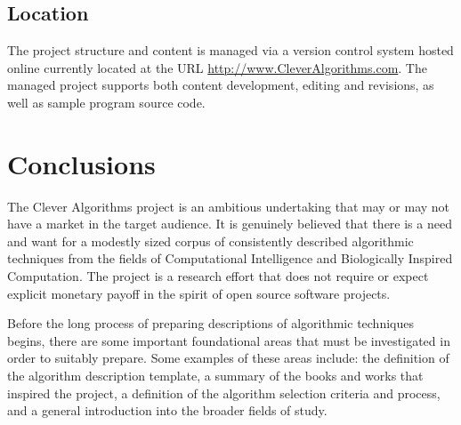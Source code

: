 \documentclass[a4paper, 11pt]{article}
\begin{document}
\subsection{Location}
The project structure and content is managed via a version control system hosted online currently located at the URL \url{http://www.CleverAlgorithms.com}. The managed project supports both content development, editing and revisions, as well as sample program source code.

\section{Conclusions}
\label{sec:conclusions}
The Clever Algorithms project is an ambitious undertaking that may or may not have a market in the target audience. It is genuinely believed that there is a need and want for a modestly sized corpus of consistently described algorithmic techniques from the fields of Computational Intelligence and Biologically Inspired Computation. The project is a research effort that does not require or expect explicit monetary payoff in the spirit of open source software projects. 

Before the long process of preparing descriptions of algorithmic techniques begins, there are some important foundational areas that must be investigated in order to suitably prepare. Some examples of these areas include: the definition of the algorithm description template, a summary of the books and works that inspired the project, a definition of the algorithm selection criteria and process, and a general introduction into the broader fields of study. 
\end{document}
